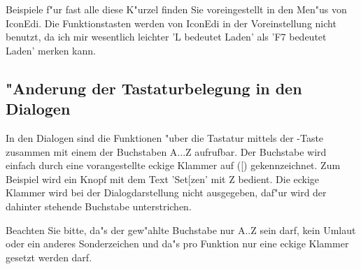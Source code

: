 Beispiele f"ur fast alle diese K"urzel finden Sie voreingestellt in 
den Men"us von IconEdi. Die Funktionstasten werden von IconEdi in der
Voreinstellung nicht benutzt, da ich mir wesentlich leichter 
'{\control}L bedeutet Laden' als 'F7 bedeutet Laden' merken kann.

\subsection{"Anderung der Tastaturbelegung in den Dialogen}
In den Dialogen sind die Funktionen "uber die Tastatur mittels
der {\alternate}-Taste zusammen mit einem der Buchstaben A...Z
aufrufbar. Der Buchstabe wird einfach durch eine vorangestellte
eckige Klammer auf ([) gekennzeichnet. Zum Beispiel wird ein Knopf
mit dem Text 'Set[zen' mit {\alternate}Z bedient. Die eckige
Klammer wird bei der Dialogdarstellung nicht ausgegeben, daf"ur
wird der dahinter stehende Buchstabe unterstrichen.

Beachten Sie bitte, da"s der gew"ahlte Buchstabe nur A..Z sein darf,
kein Umlaut oder ein anderes Sonderzeichen und da"s pro Funktion nur
eine eckige Klammer gesetzt werden darf.

